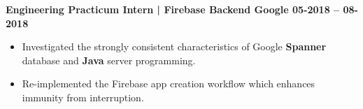 \textbf{Engineering Practicum Intern | Firebase Backend \hspace{-10mm} \hfill Google \hfill  05-2018 -- 08-2018}\par

\begin{itemize}
        \item Investigated the strongly consistent characteristics of Google \textbf{Spanner} database and \textbf{Java} server programming.
        \item Re-implemented the Firebase app creation workflow which enhances immunity from interruption.
\end{itemize}\par